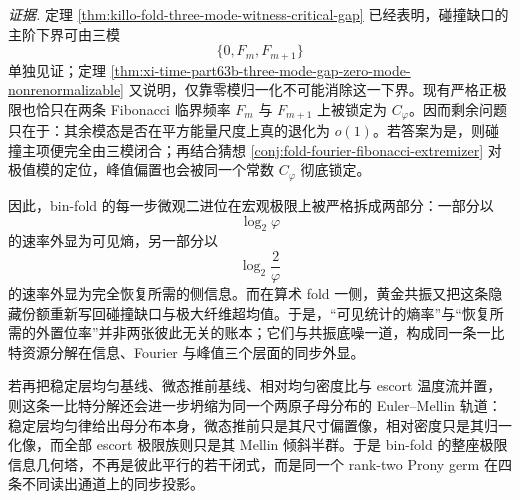 \noindent\emph{证据.}
定理 \ref{thm:killo-fold-three-mode-witness-critical-gap} 已经表明，碰撞缺口的主阶下界可由三模
\[
\{0,F_m,F_{m+1}\}
\]
单独见证；定理 \ref{thm:xi-time-part63b-three-mode-gap-zero-mode-nonrenormalizable} 又说明，仅靠零模归一化不可能消除这一下界。现有严格正极限也恰只在两条 Fibonacci 临界频率 \(F_m\) 与 \(F_{m+1}\) 上被锁定为 \(C_\varphi\)。因而剩余问题只在于：其余模态是否在平方能量尺度上真的退化为 \(o(1)\)。若答案为是，则碰撞主项便完全由三模闭合；再结合猜想 \ref{conj:fold-fourier-fibonacci-extremizer} 对极值模的定位，峰值偏置也会被同一个常数 \(C_\varphi\) 彻底锁定。

\noindent
因此，bin-fold 的每一步微观二进位在宏观极限上被严格拆成两部分：一部分以
\[
\log_2\varphi
\]
的速率外显为可见熵，另一部分以
\[
\log_2\frac{2}{\varphi}
\]
的速率外显为完全恢复所需的侧信息。而在算术 fold 一侧，黄金共振又把这条隐藏份额重新写回碰撞缺口与极大纤维超均值。于是，“可见统计的熵率”与“恢复所需的外置位率”并非两张彼此无关的账本；它们与共振底噪一道，构成同一条一比特资源分解在信息、Fourier 与峰值三个层面的同步外显。

若再把稳定层均匀基线、微态推前基线、相对均匀密度比与 escort 温度流并置，则这条一比特分解还会进一步坍缩为同一个两原子母分布的 Euler--Mellin 轨道：稳定层均匀律给出母分布本身，微态推前只是其尺寸偏置像，相对密度只是其归一化像，而全部 escort 极限族则只是其 Mellin 倾斜半群。于是 bin-fold 的整座极限信息几何塔，不再是彼此平行的若干闭式，而是同一个 rank-two Prony germ 在四条不同读出通道上的同步投影。





\endinput
